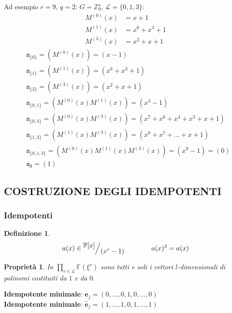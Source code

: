 \documentclass[mathserif]{beamer}
\def\quotient#1#2{%
   \raise1ex\hbox{$#1$}\Big/\lower1ex\hbox{$#2$}%
}
\newtheorem{definizione}{Definizione}
\newtheorem{prop}{Proprietà}
\begin{document}
\thispagestyle{empty}
\begin{frame}
   \vspace{-1.3cm}
     Ad esempio $r = 9$, $q = 2$: $ G = \mathbb{Z}_{9}^{\star} $, $\mathscr{L} = \lbrace 0,1,3 \rbrace$:
      \begin{align*}
	  M^{(0)}(x) &= x+1 \\
	  M^{(1)}(x) &= x^6+x^3+1 \\
	  M^{(3)}(x) &= x^2+x+1
      \end{align*}
      \begin{align*}
	  &\mathfrak{a}_{\lbrace 0 \rbrace} = (M^{(0)}(x)) = (x-1) \\
	  &\mathfrak{a}_{\lbrace 1 \rbrace} = (M^{(1)}(x)) = (x^6+x^3+1) \\
	  &\mathfrak{a}_{\lbrace 3 \rbrace} = (M^{(3)}(x)) = (x^2+x+1) \\
	  &\mathfrak{a}_{\lbrace 0,1 \rbrace} = (M^{(0)}(x)M^{(1)}(x)) = (x^3 -1) \\
	  &\mathfrak{a}_{\lbrace 0,3 \rbrace} = (M^{(0)}(x)M^{(3)}(x)) = (x^7 + x^6 + x^4 + x^3 + x + 1) \\
	  &\mathfrak{a}_{\lbrace 1,3 \rbrace}
			= (M^{(1)}(x)M^{(3)}(x)) = (x^8 + x^7 + \dots + x + 1) \\
	  &\mathfrak{a}_{\lbrace 0,1,3 \rbrace} = (M^{(0)}(x)M^{(1)}(x)M^{(3)}(x)) = (x^9 -1) = (0) \\
	  &\mathfrak{a}_{\emptyset} = (1)
      \end{align*}
\end{frame}


\subsection{COSTRUZIONE DEGLI IDEMPOTENTI}
\begin{frame}
  \frametitle{Idempotenti}
  \begin{definizione}
     $ $  %
     \begin{align*}
        a(x) \in \quotient{\mathbb{F} \lbrack x \rbrack  }{ (x^{r} - 1)} \qquad \qquad a(x)^2 = a(x)
     \end{align*}
  \end{definizione}
    \begin{prop}
      In $  \prod_{v\in \mathscr{L}} \mathbb{F}(\xi^{v})$ sono tutti e soli i vettori $l$-dimensionali di polinomi costituiti da $1$ e da $0$.
    \end{prop}
    {\bf Idempotente minimale}: $  \mathbf{e}_{j} = (0, \dots, 0,1,0, \dots, 0)$ \\
    {\bf Idempotente minimale}: $  \mathbf{\hat{e}}_{j} = (1, \dots, 1,0,1, \dots, 1)$
\end{frame}
\end{document}
